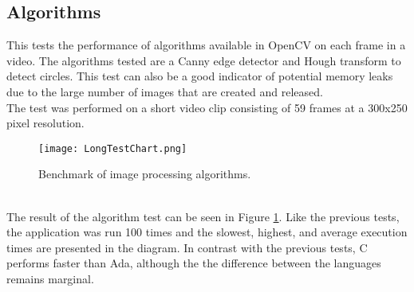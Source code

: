 \subsection{Algorithms}
This tests the performance of algorithms available in OpenCV on each frame in a video. The algorithms tested are a Canny edge detector and Hough transform to detect circles. This test can also be a good indicator of potential memory leaks due to the large number of images that are created and released. 
\\
The test was performed on a short video clip consisting of 59 frames at a 300x250 pixel resolution.
\begin{figure}
\centering
\texttt{[image: LongTestChart.png]}
\caption{Benchmark of image processing algorithms.}
\label{fig:LongTestChart}
\end{figure}
\\
The result of the algorithm test can be seen in Figure \ref{fig:LongTestChart}. Like the previous tests, the application was run 100 times and the slowest, highest, and average execution times are presented in the diagram. In contrast with the previous tests, C performs faster than Ada, although the the difference between the languages remains marginal.
